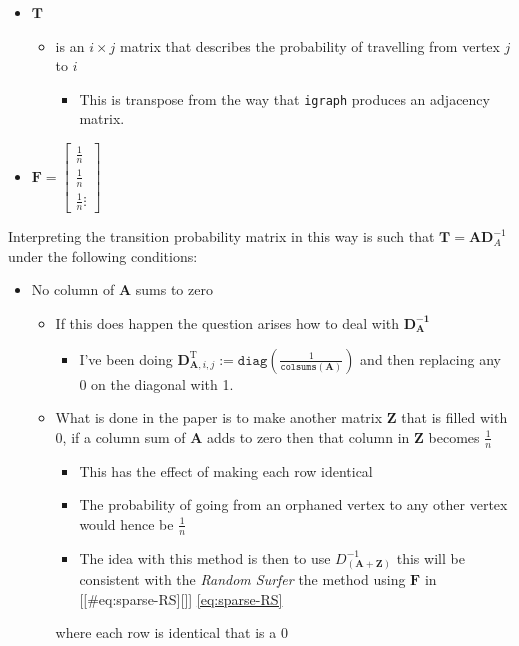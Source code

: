 \documentclass[11pt]{article}
\begin{document}
\begin{itemize}
\item \(\mathbf{T}\)

\begin{itemize}
\item is an \(i \times j\) matrix that describes the probability of
travelling from vertex \(j\) to \(i\)

\begin{itemize}
\item This is transpose from the way that \texttt{igraph} produces an adjacency
matrix.
\end{itemize}
\end{itemize}

\item \(\mathbf{F} = \begin{bmatrix} \frac{1}{n} \\ \frac{1}{n} \\ \frac{1}{n} \vdots \end{bmatrix}\)
\end{itemize}

Interpreting the transition probability matrix in this way is such that
\(\mathbf{T}= \mathbf{A}\mathbf{D}^{- 1}_A\) under the following
conditions:


\begin{itemize}
\item No column of \(\mathbf{A}\) sums to zero

\begin{itemize}
\item If this does happen the question arises how to deal with
\(\mathbf{D_\mathbf{A}^{- 1}}\)

\begin{itemize}
\item I've been doing \(\mathbf{D}^{\mathrm{T}}_{\mathbf{A}, i, j} := \mathtt{diag} \left( {\frac{1}{\mathtt{colsums}\left( \mathbf{A} \right)}} \right)\)
and then replacing any \(0\) on the diagonal with 1.
\end{itemize}

\item What is done in the paper is to make another matrix \(\mathbf{Z}\)
that is filled with 0, if a column sum of \(\mathbf{A}\) adds to zero
then that column in \(\mathbf{Z}\) becomes \(\frac{1}{n}\)

\begin{itemize}
\item This has the effect of making each row identical

\item The probability of going from an orphaned vertex to any other
vertex would hence be \(\frac{1}{n}\)

\item The idea with this method is then to use
\(D_\mathbf{\left( A+Z \right)}^{- 1}\) this will be consistent with
the \emph{Random Surfer} the method using \(\mathbf{F}\) in
[[\#eq:sparse-RS][]] \eqref{eq:sparse-RS}
\end{itemize}

where each row is identical that is a 0
\end{itemize}
\end{itemize}
\end{document}
